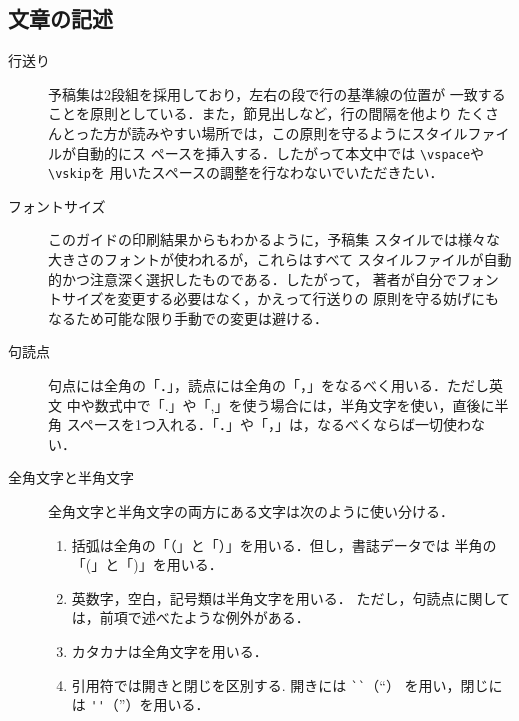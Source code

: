 \documentclass[a4j, 9pt, twocolumn, twoside]{jsarticle}
\begin{document}
\subsection{文章の記述}
\begin{description}
\item[行送り]{予稿集は2段組を採用しており，左右の段で行の基準線の位置が
一致することを原則としている．また，節見出しなど，行の間隔を他より
たくさんとった方が読みやすい場所では，この原則を守るようにスタイルファイルが自動的にス
ペースを挿入する．したがって本文中では \verb+\vspace+や\verb+\vskip+を
用いたスペースの調整を行なわないでいただきたい．}
\item[フォントサイズ]{このガイドの印刷結果からもわかるように，予稿集
スタイルでは様々な大きさのフォントが使われるが，これらはすべて
スタイルファイルが自動的かつ注意深く選択したものである．したがって，
著者が自分でフォントサイズを変更する必要はなく，かえって行送りの
原則を守る妨げにもなるため可能な限り手動での変更は避ける．}
\item[句読点]{句点には全角の「．」，読点には全角の「，」をなるべく用いる．ただし英文
中や数式中で「.」や「,」を使う場合には，半角文字を使い，直後に半角
スペースを1つ入れる．「．」や「，」は，なるべくならば一切使わない．}
\item[全角文字と半角文字]{
全角文字と半角文字の両方にある文字は次のように使い分ける．
\begin{enumerate}
\item{括弧は全角の「（」と「）」を用いる．但し，書誌データでは
半角の「(」と「)」を用いる．}
\item{英数字，空白，記号類は半角文字を用いる．
ただし，句読点に関しては，前項で述べたような例外がある．}
\item{カタカナは全角文字を用いる．}
\item{引用符では開きと閉じを区別する. 開きには \verb+``+（``）
を用い，閉じには \verb+''+（''）を用いる．}
\end{enumerate}
}
\end{description}
\end{document}
